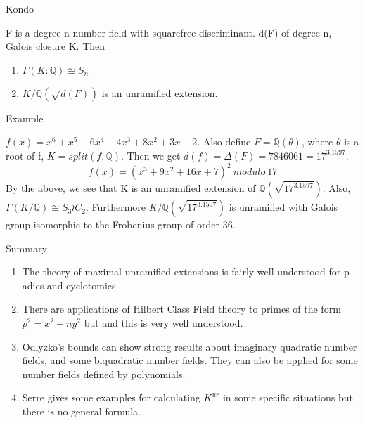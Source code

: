\documentclass[10pt]{beamer}
\begin{document}
\begin{frame}{Kondo}
    \begin{theorem}
   F is a degree n number field with squarefree discriminant.  d(F) of degree n, Galois closure K. Then \begin{enumerate}
        \item $\Gamma(K:\mathbb{Q})\cong S_n$
        \item $K/\mathbb{Q}(\sqrt{d(F)})$ is an unramified extension.
    \end{enumerate}
\end{theorem}
\end{frame}
\begin{frame}{Example}
\begin{example}
 $f(x)=x^6 + x^5 - 6x^4 - 4x^3 + 8x^2 + 3x - 2$. Also define $F=\mathbb{Q}(\theta)$, where $\theta$ is a root of f, $K=split(f,\mathbb{Q})$. Then we get $d(f)=\Delta(F)=7846061=17^3.1597$. 
\begin{equation}
   f(x)= (x^3 + 9x^2 + 16x + 7)^2\:modulo\:17
\end{equation}
By the above, we see that K is an unramified extension of $\mathbb{Q}(\sqrt{17^3.1597})$. Also, $\Gamma(K/\mathbb{Q})\cong S_3 \wr C_2$. Furthermore $K/\mathbb{Q}(\sqrt{17^3.1597})$ is unramified with Galois group isomorphic to the Frobenius group of order 36.
\end{example}    
\end{frame}
\begin{frame}{Summary}
    \begin{enumerate}
        \item The theory of maximal unramified extensions is fairly well understood for p-adics and cyclotomics
        \item There are applications of Hilbert Class Field theory to primes of the form $p^2=x^2+ny^2$ but and this is very well understood. 
         \item Odlyzko's bounds can show strong results about imaginary quadratic number fields, and some biquadratic number fields. They can also be applied for some number fields defined by polynomials. 
         \item Serre gives some examples for calculating $K^{ur}$ in some specific situations but there is no general formula. 
         
    \end{enumerate}
\end{frame}
\end{document}
